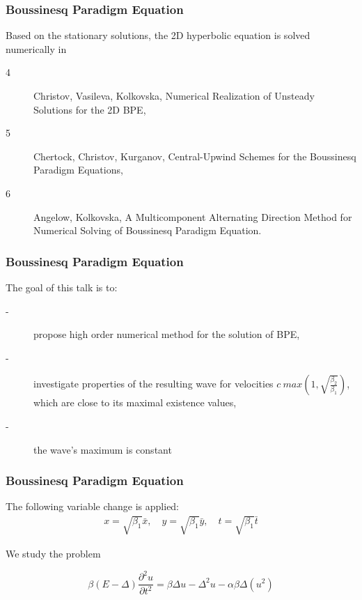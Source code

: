 \documentclass{beamer}
\newcommand{\be}{\begin{equation}}
\newcommand{\ee}{\end{equation}}
\begin{document}

\begin{frame}
\frametitle{Boussinesq Paradigm Equation}


Based on the stationary solutions, the 2D hyperbolic equation is solved numerically in 
\begin{description}
 \item[4] Christov, Vasileva, Kolkovska, Numerical Realization of Unsteady Solutions for the 2D BPE,
 \item[5] Chertock, Christov, Kurganov, Central-Upwind Schemes for the Boussinesq Paradigm Equations, 
  \item[6] Angelow, Kolkovska, A Multicomponent Alternating Direction Method for Numerical Solving of Boussinesq Paradigm Equation.
\end{description}
\end{frame}


\begin{frame}
\frametitle{Boussinesq Paradigm Equation}

The goal of this talk is to:
\begin{description}
 \item[-] propose high order numerical method for the solution of BPE,
 \item[-] investigate properties of the resulting wave for velocities $c ~ max(1, \sqrt{ \frac{\beta_2}{\beta_1} } )$, which are close to its maximal existence values,
 \item[-] the wave's maximum is constant
\end{description}
\end{frame}


\begin{frame}
\frametitle{Boussinesq Paradigm Equation}
The following variable change is applied:
\begin{align}
x = \sqrt{\beta_1} \bar{x}, \quad y = \sqrt{\beta_1} \bar{y}, \quad t = \sqrt{\beta_1} \bar{t}
\end{align}

We study the problem

\be\label{problem}
\beta(E-\Delta) \frac{\partial^2 u}{\partial t^2}=
 \beta \Delta u -\Delta^2 u -\alpha \beta \Delta (u^2)
\ee

\end{frame}
\end{document}
